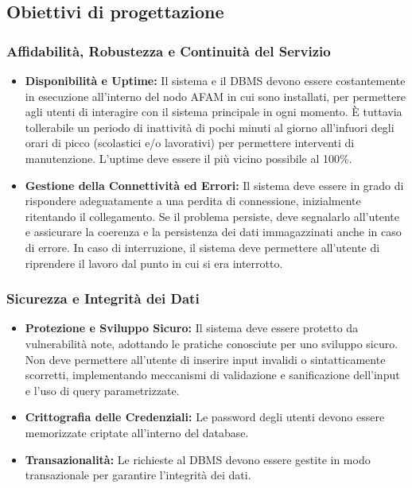 \subsection{Obiettivi di progettazione}

\subsubsection{Affidabilità, Robustezza e Continuità del Servizio}
\begin{itemize}
    \item \textbf{Disponibilità e Uptime:} Il sistema e il DBMS devono essere costantemente in esecuzione all'interno del nodo AFAM in cui sono installati, per permettere agli utenti di interagire con il sistema principale in ogni momento. È tuttavia tollerabile un periodo di inattività di pochi minuti al giorno all'infuori degli orari di picco (scolastici e/o lavorativi) per permettere interventi di manutenzione. L'uptime deve essere il più vicino possibile al 100\%.
    \item \textbf{Gestione della Connettività ed Errori:} Il sistema deve essere in grado di rispondere adeguatamente a una perdita di connessione, inizialmente ritentando il collegamento. Se il problema persiste, deve segnalarlo all'utente e assicurare la coerenza e la persistenza dei dati immagazzinati anche in caso di errore. In caso di interruzione, il sistema deve permettere all'utente di riprendere il lavoro dal punto in cui si era interrotto.
\end{itemize}

\subsubsection{Sicurezza e Integrità dei Dati}
\begin{itemize}
    \item \textbf{Protezione e Sviluppo Sicuro:} Il sistema deve essere protetto da vulnerabilità note, adottando le pratiche conosciute per uno sviluppo sicuro. Non deve permettere all'utente di inserire input invalidi o sintatticamente scorretti, implementando meccanismi di validazione e sanificazione dell'input e l'uso di query parametrizzate.
    \item \textbf{Crittografia delle Credenziali:} Le password degli utenti devono essere memorizzate criptate all'interno del database.
    \item \textbf{Transazionalità:} Le richieste al DBMS devono essere gestite in modo transazionale per garantire l'integrità dei dati.
\end{itemize}

